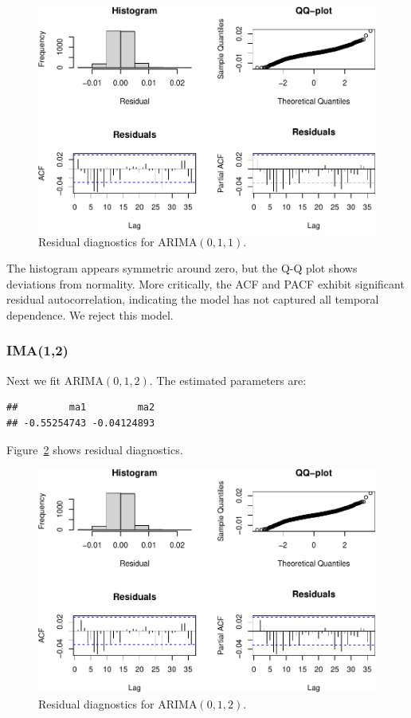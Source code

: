 \documentclass[final,11pt]{article}
\theoremstyle{plain}
\theoremstyle{remark}
\begin{document}
\begin{figure}
\includegraphics{paper_files/figure-latex/unnamed-chunk-9-1.pdf}
\caption{Residual diagnostics for ARIMA$(0,1,1)$.}
\label{fig:resv}
\end{figure}

The histogram appears symmetric around zero, but the Q-Q plot shows
deviations from normality. More critically, the ACF and PACF exhibit
significant residual autocorrelation, indicating the model has not captured
all temporal dependence. We reject this model.

\hypertarget{ima12}{%
\subsubsection{IMA(1,2)}\label{ima12}}

Next we fit ARIMA$(0,1,2)$. The estimated parameters are:

\begin{verbatim}
##         ma1         ma2
## -0.55254743 -0.04124893
\end{verbatim}

Figure~\ref{fig:res3} shows residual diagnostics.

\begin{figure}
\includegraphics{paper_files/figure-latex/unnamed-chunk-11-1.pdf}
    \caption{Residual diagnostics for ARIMA$(0,1,2)$.}
    \label{fig:res3}
\end{figure}
\end{document}
